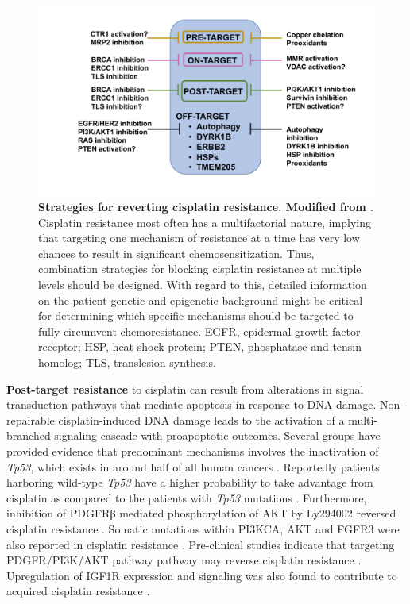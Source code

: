 \begin{figure}
\centering
\includegraphics[width=\textwidth]{Figures/circumventingcisplatinresistance.pdf}
	\caption[Mechanism of action of cisplatin]
	{\small
	    \textbf{Strategies for reverting cisplatin resistance. Modified from  \cite{galluzzi2012molecular}}.
	     Cisplatin resistance most often has a multifactorial nature, implying that targeting one mechanism of resistance at a time has very low chances to result in significant chemosensitization. Thus, combination strategies for blocking cisplatin resistance at multiple levels should be designed. With regard to this, detailed information on the patient genetic and epigenetic background might be critical for determining which specific mechanisms should be targeted to fully circumvent chemoresistance. EGFR, epidermal growth factor receptor; HSP, heat-shock protein; PTEN, phosphatase and tensin homolog; TLS, translesion synthesis.
	}
	\label{fig:circumventingcisplatinresistance}
\end{figure}



\textbf{Post-target resistance} to cisplatin can result from alterations in signal transduction pathways that mediate apoptosis in response to DNA damage. Non-repairable cisplatin-induced DNA damage leads to the activation of a multi-branched signaling cascade with proapoptotic outcomes. Several groups have provided evidence that predominant mechanisms involves the inactivation of \textit{Tp53}, which exists in around half of all human cancers \cite{kirsch1998tumor}. Reportedly patients harboring wild-type \textit{Tp53} have a higher probability to take advantage from cisplatin as compared to the patients with \textit{Tp53} mutations \cite{vousden2007p53,gadducci2002molecular}. 
Furthermore, inhibition of PDGFRβ mediated phosphorylation of AKT by Ly294002 reversed cisplatin resistance \cite{juliachs2014pdgfrbeta}. Somatic mutations within PI3KCA, AKT and FGFR3 were also reported in cisplatin resistance \cite{feldman2014presence}. Pre-clinical studies indicate that targeting PDGFR/PI3K/AKT pathway  pathway may reverse cisplatin resistance \cite{juliachs2013effectivity}.
Upregulation of IGF1R expression and signaling was also found to contribute to acquired cisplatin resistance \cite{selfe2018igf1r}. 

